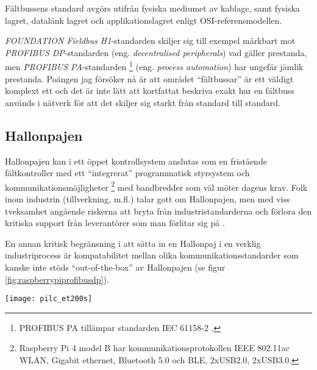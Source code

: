 \documentclass[a4paper,12pt]{article}
\begin{document}
\begin{multicols}{2}
Fältbussens standard avgörs utifrån fysiska mediumet av kablage, samt fysiska lagret, datalänk lagret och applikationslagret enligt OSI-referensmodellen. 


\textit{\MakeUppercase{Foundation} Fieldbus H1}-standarden  skiljer sig till exempel märkbart mot \textit{PROFIBUS DP}-standarden (eng. \textit{decentralised peripherals}) vad gäller prestanda, men \textit{PROFIBUS PA}-standarden \footnote{PROFIBUS PA tillämpar standarden IEC 61158-2 \cite{profibuspowerplants} \cite[s. 1083]{fieldbustechindustrialautomation}.} (eng. \textit{process automation}) har ungefär jämlik prestanda. Poängen jag försöker nå är att området \enquote{fältbussar} är ett väldigt komplext ett och det är inte lätt att kortfattat beskriva exakt hur en fältbuss används i nätverk för att det skiljer sig starkt från standard till standard.

\subsection{Hallonpajen}

Hallonpajen kan i ett öppet kontrollsystem anslutas som en fristående fältkontroller med ett \enquote{integrerat} programmatisk styrsystem och kommunikationsmöjligheter \footnote{Raspberry Pi 4 model B har kommunikationsprotokollen IEEE 802.11ac WLAN, Gigabit ethernet, Bluetooth 5.0 och BLE, 2xUSB2.0, 2xUSB3.0.} med bandbredder som väl möter dagens krav. Folk inom industrin (tillverkning, m.fl.) talar gott om Hallonpajen, men med viss tveksamhet angående riskerna att bryta från industristandarderna och förlora den kritiska support från leverantörer som man förlitar sig på \cite{raspberrypireadyforindustry}.

En annan kritisk begränsning i att sätta in en Hallonpaj i en verklig industriprocess är kompatabilitet mellan olika kommunikationsstandarder som kanske inte stöds \enquote{out-of-the-box} av Hallonpajen (se figur \ref{fig:raspberrypiprofibusdp}).

\begin{minipage}{\linewidth}
		\texttt{[image: pilc\_et200s]}
		\label{fig:raspberrypiprofibusdp}
\end{minipage}


\end{multicols}
\end{document}
